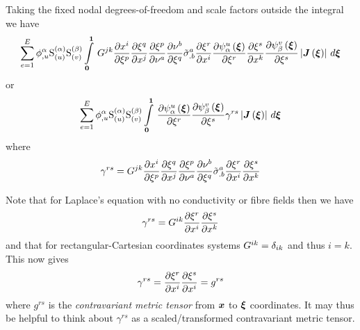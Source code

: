 Taking the fixed nodal degrees-of-freedom and scale factors outside the integral we have
\begin{equation}
  \dsum_{e=1}^{E}\nodedof{\phi}{\alpha}{u}\gsf{(\alpha)}{(u)}\gsf{(\beta)}{(v)}
  \gint{\vect{0}}{\vect{1}}{G^{jk}\delby{x^{i}}{\xi^{p}}
    \delby{\xi^{q}}{x^{j}}\delby{\xi^{p}} {\nu^{a}}
    \delby{\nu^{b}}{\xi^{q}}{\tilde{\sigma}}^{a}_{.b}\delby{\xi^{r}}{x^{i}}
    \delby{\gbfn{\alpha}{u}{\vect{\xi}}}{\xi^{r}}
    \delby{\xi^{s}}{x^{k}}\delby{\gbfn{\beta}{v}{\vect{\xi}}}{\xi^{s}}
    \abs{\fnof{\matr{J}}{\vect{\xi}}}}{\vect{\xi}}
  \label{eqn:elementalfemlhs1}
\end{equation}
or
\begin{equation}
  \dsum_{e=1}^{E}\nodedof{\phi}{\alpha}{u}\gsf{(\alpha)}{(u)}\gsf{(\beta)}{(v)}
  \gint{\vect{0}}{\vect{1}}{\delby{\gbfn{\alpha}{u}{\vect{\xi}}}{\xi^{r}}\delby{\gbfn{\beta}{v}{\vect{\xi}}}{\xi^{s}}\gamma^{rs}
    \abs{\fnof{\matr{J}}{\vect{\xi}}}}{\vect{\xi}}
  \label{eqn:elementalfemlhs2}
\end{equation}
where
\begin{equation}
  \gamma^{rs}=G^{jk} \dfrac{\partial x^{i}}{\partial \xi^{p}} 
     \dfrac{\partial \xi^{q}}{\partial x^{j}}  \dfrac{\partial \xi^{p}}{\partial \nu^{a}} 
     \dfrac{\partial \nu^{b}}{\partial \xi^{q}} {\tilde{\sigma}}^{a}_{.b} \dfrac{\partial \xi^{r}}{\partial x^{i}}  \dfrac{\partial \xi^{s}}{\partial x^{k}} 
\end{equation}

Note that for Laplace's equation with no conductivity or fibre fields then we have
\begin{equation}
  \gamma^{rs}=G^{ik} \dfrac{\partial \xi^{r}}{\partial x^{i}}  \dfrac{\partial \xi^{s}}{\partial x^{k}} 
\end{equation}
and that for rectangular-Cartesian coordinates systems
$G^{ik}=\delta_{{i}{k}}$ and thus $i=k$. This now gives
\begin{equation}
  \gamma^{rs}= \dfrac{\partial \xi^{r}}{\partial x^{i}}  \dfrac{\partial \xi^{s}}{\partial x^{i}} =g^{rs}
  \label{eqn:contrametrictensor}
\end{equation}
where $g^{rs}$ is the \emph{contravariant metric tensor} from $\vect{x}$ to
$\vect{\xi}$ coordinates. It may thus be helpful to think about $\gamma^{rs}$
as a scaled/transformed contravariant metric tensor.

